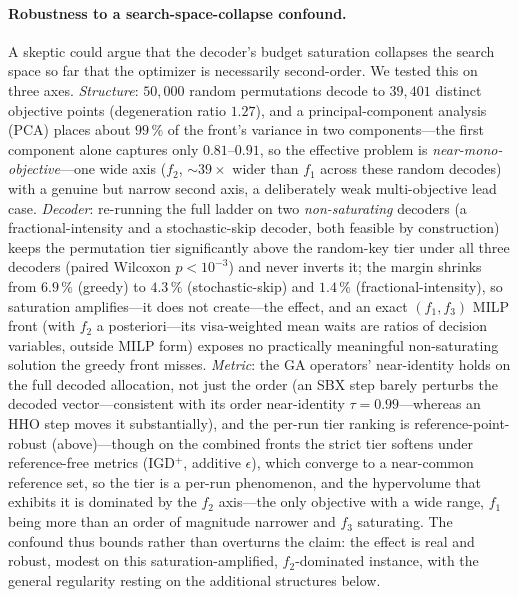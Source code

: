 \documentclass[runningheads]{llncs}
\newcommand{\IGD}{\textsf{IGD}}
\begin{document}
\paragraph{Robustness to a search-space-collapse confound.}
A skeptic could argue that the decoder's budget saturation collapses the search space so far that the optimizer is necessarily second-order. We tested this on three axes. \emph{Structure}: $50{,}000$ random permutations decode to $39{,}401$ distinct objective points (degeneration ratio $1.27$), and a principal-component analysis (PCA) places about $99\,\%$ of the front's variance in two components---the first component alone captures only $0.81$--$0.91$, so the effective problem is \emph{near-mono-objective}---one wide axis ($f_2$, $\sim$$39\times$ wider than $f_1$ across these random decodes) with a genuine but narrow second axis, a deliberately weak multi-objective lead case. \emph{Decoder}: re-running the full ladder on two \emph{non-saturating} decoders (a fractional-intensity and a stochastic-skip decoder, both feasible by construction) keeps the permutation tier significantly above the random-key tier under all three decoders (paired Wilcoxon $p<10^{-3}$) and never inverts it; the margin shrinks from $6.9\,\%$ (greedy) to $4.3\,\%$ (stochastic-skip) and $1.4\,\%$ (fractional-intensity), so saturation amplifies---it does not create---the effect, and an exact $(f_1,f_3)$ MILP front (with $f_2$ a posteriori---its visa-weighted mean waits are ratios of decision variables, outside MILP form) exposes no practically meaningful non-saturating solution the greedy front misses. \emph{Metric}: the GA operators' near-identity holds on the full decoded allocation, not just the order (an SBX step barely perturbs the decoded vector---consistent with its order near-identity $\tau=0.99$---whereas an HHO step moves it substantially), and the per-run tier ranking is reference-point-robust (above)---though on the combined fronts the strict tier softens under reference-free metrics (\IGD$^{+}$, additive $\epsilon$), which converge to a near-common reference set, so the tier is a per-run phenomenon, and the hypervolume that exhibits it is dominated by the $f_2$ axis---the only objective with a wide range, $f_1$ being more than an order of magnitude narrower and $f_3$ saturating. The confound thus bounds rather than overturns the claim: the effect is real and robust, modest on this saturation-amplified, $f_2$-dominated instance, with the general regularity resting on the additional structures below.
\end{document}

